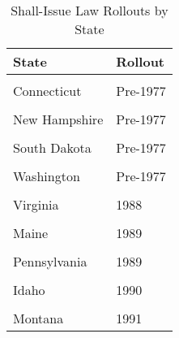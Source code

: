 \begin{table}[H]

\caption{\label{tab:LawRollout}Shall-Issue Law Rollouts by State}
\centering
\begin{tabular}[t]{ll}
\toprule
State & Rollout\\
\midrule
\cellcolor{gray!6}{Alabama} & \cellcolor{gray!6}{Pre-1977}\\
Connecticut & Pre-1977\\
\cellcolor{gray!6}{Indiana} & \cellcolor{gray!6}{Pre-1977}\\
New Hampshire & Pre-1977\\
\cellcolor{gray!6}{North Dakota} & \cellcolor{gray!6}{Pre-1977}\\
\addlinespace
South Dakota & Pre-1977\\
\cellcolor{gray!6}{Vermont} & \cellcolor{gray!6}{Pre-1977}\\
Washington & Pre-1977\\
\cellcolor{gray!6}{Florida} & \cellcolor{gray!6}{1987}\\
Virginia & 1988\\
\addlinespace
\cellcolor{gray!6}{Georgia} & \cellcolor{gray!6}{1989}\\
Maine & 1989\\
\cellcolor{gray!6}{Oregon} & \cellcolor{gray!6}{1989}\\
Pennsylvania & 1989\\
\cellcolor{gray!6}{West Virginia} & \cellcolor{gray!6}{1989}\\
\addlinespace
Idaho & 1990\\
\cellcolor{gray!6}{Mississipi} & \cellcolor{gray!6}{1990}\\
Montana & 1991\\
\bottomrule
\end{tabular}
\end{table}
